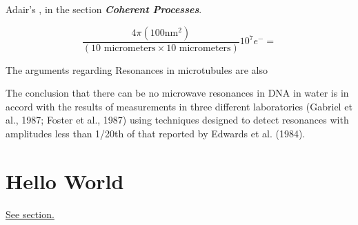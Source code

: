 \documentclass[paper.tex]{subfiles}
\begin{document}
Adair's \cite{Vibrational2002}, in the section {\it \bf Coherent Processes}. 

$$\frac{4 \pi (100 \text{nm}^2)}{(10 \text{ micrometers} \times 10 \text{ micrometers})} 10^7 e^- = $$

The arguments regarding Resonances in microtubules are also 

\cite{Vibrational2002}
The conclusion that there can be no microwave resonances in DNA in water is in accord with the results of
measurements in three different laboratories (Gabriel et al.,
1987; Foster et al., 1987) using techniques designed to
detect resonances with amplitudes less than 1/20th of that
reported by Edwards et al. (1984).






\section{Hello World}
\label{sec:hello}
\hyperref[sec:hello]{See section.}
\end{document}
